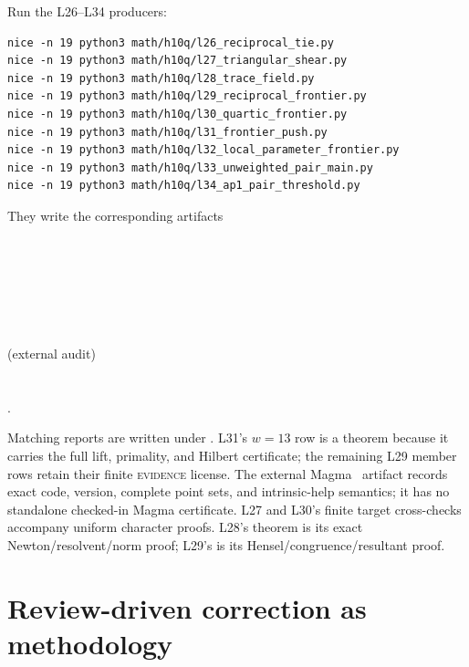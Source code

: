 \documentclass[11pt]{amsart}%
\begin{document}
Run the L26--L34 producers:
\begin{verbatim}
nice -n 19 python3 math/h10q/l26_reciprocal_tie.py
nice -n 19 python3 math/h10q/l27_triangular_shear.py
nice -n 19 python3 math/h10q/l28_trace_field.py
nice -n 19 python3 math/h10q/l29_reciprocal_frontier.py
nice -n 19 python3 math/h10q/l30_quartic_frontier.py
nice -n 19 python3 math/h10q/l31_frontier_push.py
nice -n 19 python3 math/h10q/l32_local_parameter_frontier.py
nice -n 19 python3 math/h10q/l33_unweighted_pair_main.py
nice -n 19 python3 math/h10q/l34_ap1_pair_threshold.py
\end{verbatim}
They write the corresponding artifacts
\begin{center}
\\
\\
\\
\\
\\
\\
 (external audit)\\
\\
\\
.
\end{center}
Matching reports are written under .  L31's \(w=13\) row is
a theorem because it carries the full lift, primality, and Hilbert
certificate; the remaining L29 member rows retain their finite
\textsc{evidence} license.  The external Magma~\cite{magma} artifact records exact
code, version, complete point sets, and intrinsic-help semantics; it
has no standalone checked-in Magma certificate.  L27 and L30's finite
target cross-checks accompany uniform character proofs.  L28's theorem
is its exact Newton/resolvent/norm proof; L29's is its
Hensel/congruence/resultant proof.

\section{Review-driven correction as methodology}
\end{document}
